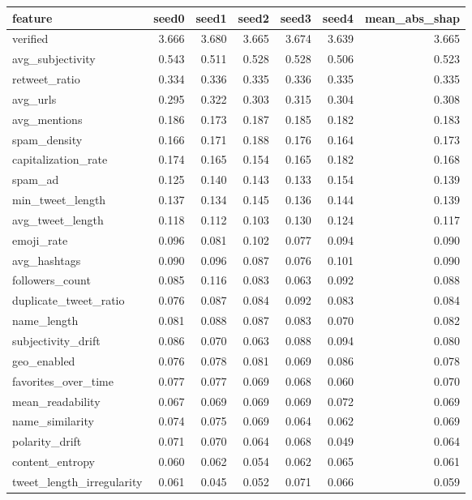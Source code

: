 \begin{tabular}{lrrrrrr}
\toprule
feature & seed0 & seed1 & seed2 & seed3 & seed4 & mean_abs_shap \\
\midrule
verified & 3.666 & 3.680 & 3.665 & 3.674 & 3.639 & 3.665 \\
avg_subjectivity & 0.543 & 0.511 & 0.528 & 0.528 & 0.506 & 0.523 \\
retweet_ratio & 0.334 & 0.336 & 0.335 & 0.336 & 0.335 & 0.335 \\
avg_urls & 0.295 & 0.322 & 0.303 & 0.315 & 0.304 & 0.308 \\
avg_mentions & 0.186 & 0.173 & 0.187 & 0.185 & 0.182 & 0.183 \\
spam_density & 0.166 & 0.171 & 0.188 & 0.176 & 0.164 & 0.173 \\
capitalization_rate & 0.174 & 0.165 & 0.154 & 0.165 & 0.182 & 0.168 \\
spam_ad & 0.125 & 0.140 & 0.143 & 0.133 & 0.154 & 0.139 \\
min_tweet_length & 0.137 & 0.134 & 0.145 & 0.136 & 0.144 & 0.139 \\
avg_tweet_length & 0.118 & 0.112 & 0.103 & 0.130 & 0.124 & 0.117 \\
emoji_rate & 0.096 & 0.081 & 0.102 & 0.077 & 0.094 & 0.090 \\
avg_hashtags & 0.090 & 0.096 & 0.087 & 0.076 & 0.101 & 0.090 \\
followers_count & 0.085 & 0.116 & 0.083 & 0.063 & 0.092 & 0.088 \\
duplicate_tweet_ratio & 0.076 & 0.087 & 0.084 & 0.092 & 0.083 & 0.084 \\
name_length & 0.081 & 0.088 & 0.087 & 0.083 & 0.070 & 0.082 \\
subjectivity_drift & 0.086 & 0.070 & 0.063 & 0.088 & 0.094 & 0.080 \\
geo_enabled & 0.076 & 0.078 & 0.081 & 0.069 & 0.086 & 0.078 \\
favorites_over_time & 0.077 & 0.077 & 0.069 & 0.068 & 0.060 & 0.070 \\
mean_readability & 0.067 & 0.069 & 0.069 & 0.069 & 0.072 & 0.069 \\
name_similarity & 0.074 & 0.075 & 0.069 & 0.064 & 0.062 & 0.069 \\
polarity_drift & 0.071 & 0.070 & 0.064 & 0.068 & 0.049 & 0.064 \\
content_entropy & 0.060 & 0.062 & 0.054 & 0.062 & 0.065 & 0.061 \\
tweet_length_irregularity & 0.061 & 0.045 & 0.052 & 0.071 & 0.066 & 0.059 \\

\end{tabular}
